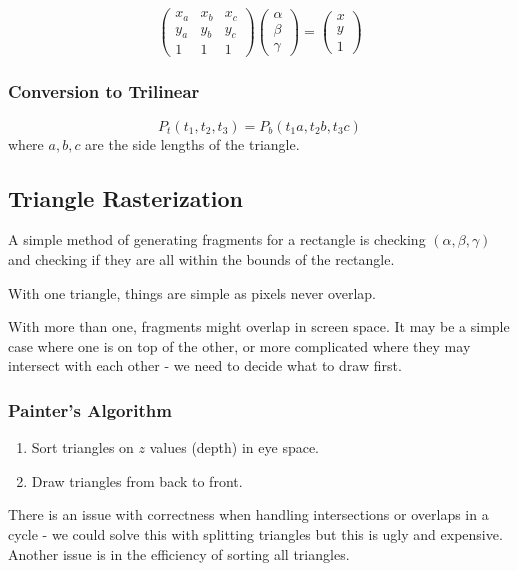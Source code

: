 \documentclass[11pt]{article}
\begin{document}
\[
  \begin{pmatrix}
    x_a & x_b & x_c \\
    y_a & y_b & y_c \\
    1 & 1 & 1
  \end{pmatrix}
  \begin{pmatrix} \alpha \\ \beta \\ \gamma \end{pmatrix}
  =
  \begin{pmatrix} x \\ y \\ 1 \end{pmatrix}
\]

\subsubsection{Conversion to Trilinear}
\[
  P_t(t_1, t_2, t_3) = P_b(t_1 a, t_2 b, t_3 c) 
\]
where $a, b, c$ are the side lengths of the triangle.

\subsection{Triangle Rasterization}
A simple method of generating fragments for a rectangle is checking $(\alpha, \beta, \gamma)$ and checking if they are all within the bounds of the rectangle.

With one triangle, things are simple as pixels never overlap.

With more than one, fragments might overlap in screen space.
It may be a simple case where one is on top of the other, or more complicated where they may intersect with each other - we need to decide what to draw first.

\subsubsection{Painter's Algorithm}
\begin{enumerate}
  \item Sort triangles on $z$ values (depth) in eye space.
  \item Draw triangles from back to front.
\end{enumerate}

There is an issue with correctness when handling intersections or overlaps in a cycle - we could solve this with splitting triangles but this is ugly and expensive.
Another issue is in the efficiency of sorting all triangles.
\end{document}
